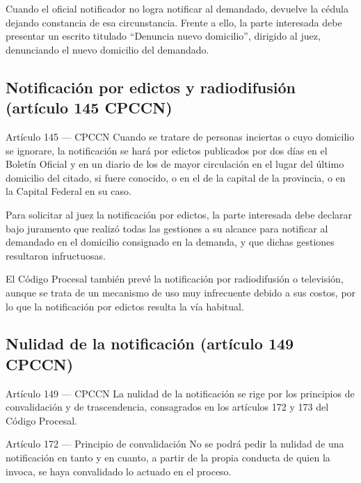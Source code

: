 \documentclass[12pt,oneside]{book}
\begin{document}
\begin{note}
Cuando el oficial notificador no logra notificar al demandado, devuelve la cédula dejando constancia de esa circunstancia. Frente a ello, la parte interesada debe presentar un escrito titulado ``Denuncia nuevo domicilio'', dirigido al juez, denunciando el nuevo domicilio del demandado.
\end{note}

\subsection{Notificación por edictos y radiodifusión (artículo 145 CPCCN)}

\begin{definition}{Artículo 145 --- CPCCN}
Cuando se tratare de personas inciertas o cuyo domicilio se ignorare, la notificación se hará por edictos publicados por dos días en el Boletín Oficial y en un diario de los de mayor circulación en el lugar del último domicilio del citado, si fuere conocido, o en el de la capital de la provincia, o en la Capital Federal en su caso.
\end{definition}

Para solicitar al juez la notificación por edictos, la parte interesada debe declarar bajo juramento que realizó todas las gestiones a su alcance para notificar al demandado en el domicilio consignado en la demanda, y que dichas gestiones resultaron infructuosas.

El Código Procesal también prevé la notificación por radiodifusión o televisión, aunque se trata de un mecanismo de uso muy infrecuente debido a sus costos, por lo que la notificación por edictos resulta la vía habitual.

\subsection{Nulidad de la notificación (artículo 149 CPCCN)}

\begin{definition}{Artículo 149 --- CPCCN}
La nulidad de la notificación se rige por los principios de convalidación y de trascendencia, consagrados en los artículos 172 y 173 del Código Procesal.
\end{definition}

\begin{definition}{Artículo 172 --- Principio de convalidación}
No se podrá pedir la nulidad de una notificación en tanto y en cuanto, a partir de la propia conducta de quien la invoca, se haya convalidado lo actuado en el proceso.
\end{definition}
\end{document}
